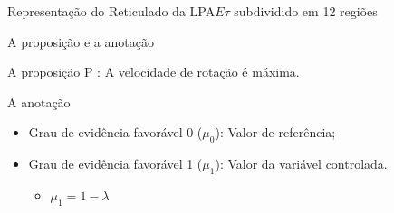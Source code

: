 \begin{frame}{Representação do Reticulado da LPA$E\tau$ {\small subdividido em 12 regiões}}
\begin{minipage}{0.45\linewidth}
\begin{figure}[!htb]
\label{fig:reticuladoLPA2v}
\end{figure}
\end{minipage}

\end{frame}












\begin{frame}{A proposição e a anotação}

\begin{exampleblock}{ A proposição }
  P : A velocidade de rotação é máxima.    
\end{exampleblock}
\begin{block}{ A anotação }
  \begin{itemize}
    \item Grau de evidência favorável 0 ($\mu_0$): Valor de referência;
    \item Grau de evidência favorável 1 ($\mu_1$): Valor da variável controlada.
      \begin{itemize}
        \item $\mu_1 = 1 - \lambda$
      \end{itemize}
  \end{itemize}
\end{block}
\end{frame}





